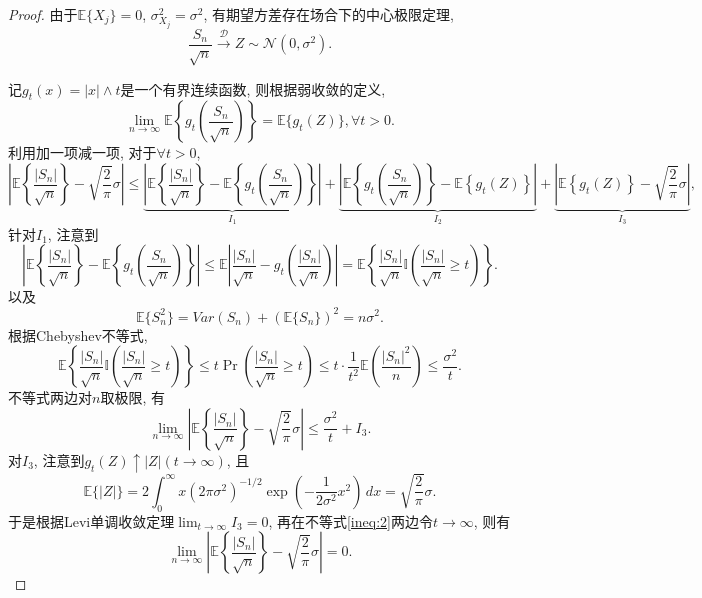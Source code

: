 \documentclass[UTF8, a4paper]{article}
\begin{document}
\begin{proof}



由于\(\mathbb{E}\{X_j\} = 0\), \(\sigma_{X_j}^2 = \sigma^2\), 有期望方差存在场合下的中心极限定理, 
$$
\frac{S_n}{ \sqrt{n}} \xrightarrow{\mathcal{D}} Z \sim \mathcal{N}(0, \sigma^2).
$$

记\(g_t(x) = |x|\land t\)是一个有界连续函数, 则根据弱收敛的定义, 
$$
\lim_{n\to\infty} \mathbb{E}\left\{g_t\left(\frac{S_n}{ \sqrt{n}}\right)\right\} = \mathbb{E}\{g_t(Z)\}, \forall t > 0.
$$
利用加一项减一项, 对于\(\forall t > 0\),
$$
\left|\mathbb{E}\left\{\frac{|S_n|}{ \sqrt{n}}\right\} - \sqrt{\frac{2}{\pi}} \sigma\right| \leq \underset{ I_1}{\underbrace{\left|\mathbb{E}\left\{\frac{|S_n|}{ \sqrt{n}}\right\} - \mathbb{E}\left\{g_t\left(\frac{S_n}{ \sqrt{n}}\right)\right\}\right|}} + \underset{I_2}{\underbrace{\left|\mathbb{E}\left\{g_t\left(\frac{S_n}{ \sqrt{n}}\right)\right\} - \mathbb{E}\left\{g_t\left(Z\right)\right\}\right|}} + \underset{I_3}{\underbrace{\left|\mathbb{E}\left\{g_t\left(Z\right)\right\} - \sqrt{\frac{2}{\pi}} \sigma\right|}},
$$
针对\(I_1\), 
注意到
$$
\left|\mathbb{E}\left\{\frac{|S_n|}{ \sqrt{n}}\right\} - \mathbb{E}\left\{g_t\left(\frac{S_n}{ \sqrt{n}}\right)\right\}\right| \leq \mathbb{E}\left|\frac{|S_n|}{\sqrt{n}} - g_t\left(\frac{|S_n|}{\sqrt{n}}\right)\right| = \mathbb{E}\left\{\frac{|S_n|}{\sqrt{n}} \mathbb{I}\left(\frac{|S_n|}{\sqrt{n}} \geq t\right)\right\}.
$$
以及 
$$
\mathbb{E}\{S_n^2\} = Var(S_n) + (\mathbb{E}\{S_n\})^2 = n\sigma^2.
$$
根据Chebyshev不等式, 
$$
\mathbb{E}\left\{\frac{|S_n|}{\sqrt{n}} \mathbb{I}\left(\frac{|S_n|}{\sqrt{n}} \geq t\right)\right\} \leq t \Pr \left(\frac{|S_n|}{\sqrt{n}} \geq t\right) \leq t\cdot \frac{1}{t^2} \mathbb{E}\left(\frac{|S_n|^2}{{n}}\right) \leq \frac{\sigma^2}{t}.
$$
不等式两边对\(n\)取极限, 有 
\begin{equation}
    \lim_{n\to\infty}\left|\mathbb{E}\left\{\frac{|S_n|}{ \sqrt{n}}\right\} - \sqrt{\frac{2}{\pi}} \sigma\right|  \leq  \frac{\sigma^2}{t} + I_3. \label{ineq:2}
\end{equation}
对\(I_3\), 注意到\(g_t(Z) \uparrow |Z|(t\to \infty)\), 且 
$$
\mathbb{E}\{|Z|\} = 2 \int_{0}^{\infty} x (2\pi\sigma^2)^{-1/2} \exp\left(-\frac{1}{2\sigma^2} x^2\right)\, dx = \sqrt{\frac{2}{\pi}}\sigma.
$$
于是根据Levi单调收敛定理\(\lim_{t\to\infty} I_3 = 0\), 再在不等式\eqref{ineq:2}两边令\(t \to \infty\), 则有 
$$
\lim_{n\to\infty}\left|\mathbb{E}\left\{\frac{|S_n|}{ \sqrt{n}}\right\} - \sqrt{\frac{2}{\pi}} \sigma\right| = 0.
$$

\end{proof}
\end{document}
